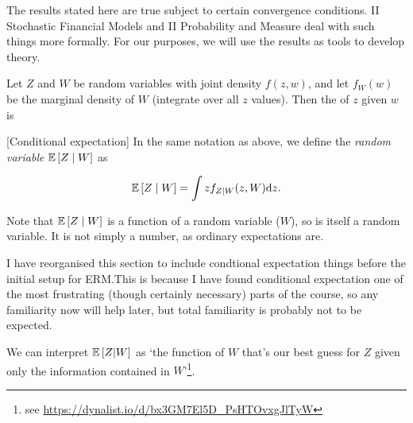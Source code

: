 \documentclass[11pt]{scrartcl}
\begin{document}
The results stated here are true subject to certain convergence conditions. II Stochastic Financial Models and II Probability and Measure deal with such things more formally. For our purposes, we will use the results as tools to develop theory.


\begin{definition}
Let $Z$ and $W$ be random variables with joint density $f(z,w)$, and let $f_W(w)$ be the marginal density of $W$ (integrate over all $z$ values). Then the  of $z$ given $w$ is


[Conditional expectation]
In the same notation as above, we define the \emph{random variable} $\mathbb{E} \left[ Z\mid W \right]$ as

\begin{equation}
    \mathbb{E} \left[ Z\mid W \right] = \int z f_{Z\mid W}(z,W) \mathrm{d}z.
\end{equation}
\end{definition}

Note that $\mathbb{E} \left[ Z\mid W \right]$ is a function of a random variable ($W$), so is itself a random variable. It is not simply a number, as ordinary expectations are. 

\begin{remark}
I have reorganised this section to include condtional expectation things before the initial setup for ERM.This is because I have found conditional expectation one of the most frustrating (though certainly necessary) parts of the course, so any familiarity now will help later, but total familiarity is probably not to be expected.
\end{remark}

\begin{remark}We can interpret $\mathbb{E} \left[ Z|W \right]$ as `the function of $W$ that's our best guess for $Z$ given only the information contained in $W$'\footnote{see \url{https://dynalist.io/d/bx3GM7El5D_PsHTOvxgJlTyW}}.
\label{neels remark}
\end{remark} 
\end{document}
